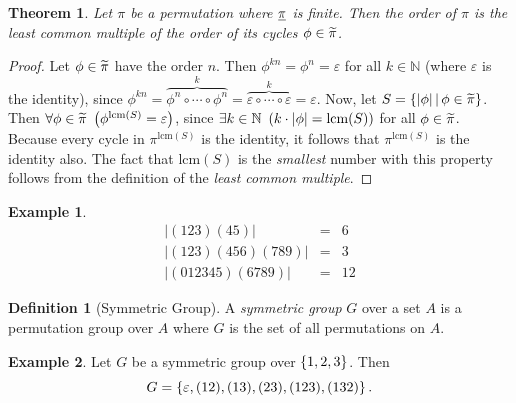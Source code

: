 \documentclass[a4paper,twoside,12pt,openany]{report}
\theoremstyle{plain}
\newtheorem{theorem}{Theorem}
\theoremstyle{definition}
\newtheorem{definition}{Definition}
\newtheorem{example}{Example}
\theoremstyle{remark}
\begin{document}
\begin{theorem}
	Let \(\pi\) be a permutation where
	\(\underline{\pi}\) is finite.
	Then the order of \(\pi\) is the least common multiple of the order of its cycles \(\phi\in\widetilde{\pi}\).
\end{theorem}

\begin{proof}
	Let \(\phi\in\widetilde{\pi}\) have the order \(n\). Then \(\phi^{kn}=\phi^n=\varepsilon\) for all \(k\in\mathbb{N}\) (where \(\varepsilon\) is the identity), since \(\phi^{kn} = \overset{k}{\overbrace{\phi^n\circ\cdots\circ\phi^n}}=\overset{k}{\overbrace{\varepsilon\circ\cdots\circ \varepsilon}}=\varepsilon\).
	Now, let \(S=\left\{ \left|\phi\right| \,\middle|\, \phi\in\widetilde{\pi} \right\}\).
	Then \(\forall \phi\in\widetilde{\pi}\ \left(\phi^{\text{lcm}(S)}=\varepsilon\right)\), since \(\exists k\in\mathbb{N}\ \left(k\cdot\left|\phi\right|=\text{lcm}(S)\right)\) for all \(\phi\in\widetilde{\pi}\). Because every cycle in \(\pi^{\text{lcm}(S)}\) is the identity, it follows that \(\pi^{\text{lcm}(S)}\) is the identity also. The fact that \(\text{lcm}(S)\) is the \textit{smallest} number with this property follows from the definition of the \textit{least common multiple}.
\end{proof}

\begin{example}
\[
	\begin{array}{rll}
		|(123)(45)| &= &6\\
		|(123)(456)(789)| &= &3\\
		|(012345)(6789)| &= &12
	\end{array}
\]
\end{example}

\begin{definition}[Symmetric Group]
	A \emph{symmetric group} \(G\) over a set \(A\) is a permutation group over \(A\) where \(G\) is the set of all permutations on \(A\).
\end{definition}

\begin{example}\label{symex}
	Let \(G\) be a symmetric group over \(\left\{ 1,2,3 \right\}\). Then 
	\[G=\left\{ \varepsilon, (12),(13),(23),(123),(132) \right\}.\]
\end{example}
\end{document}
